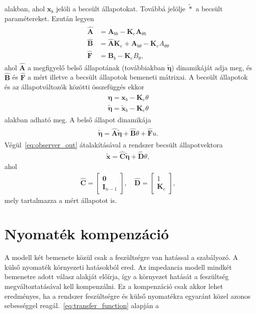 alakban, ahol $\bm{x}_b$ jelöli a becsült állapotokat. Továbbá jelölje $\tilde{*}$ 
a becsült paramétereket. Ezután legyen
\begin{align}
    \begin{split}
    \hat{\bm A} &= \bm A_{bb} - \bm K_e \bm A_{\theta b} \\
    \hat{\bm B} &= \hat{\bm A} \bm K_e + \bm A_{b \theta} - \bm K_e A_{\theta \theta} \\
    \hat{\bm F} &= \bm B_b - \bm K_e B_\theta,
    \end{split}
\end{align}
ahol $\hat{\bm A}$ a megfigyelő belső állapotának (továbbiakban $\tilde{\bm \eta}$) 
dinamikáját adja meg, és $\hat{\bm B}$ és $\hat{\bm F}$ a mért illetve a becsült állapotok 
bemeneti mátrixai. A becsült állapotok és az állapotváltozók közötti összefüggés ekkor
\begin{align}
    \begin{split}
    \bm \eta = \bm x_b - \bm K_e \theta \\
    \tilde{\bm \eta} = \tilde{\bm x}_b - \bm K_e \theta
    \end{split}
\end{align}
alakban adható meg. A belső állapot dinamikája
\begin{align}
    \begin{split}
    \dot{\tilde{\bm \eta}} = \hat{\bm A} \tilde{\bm \eta} + \hat{\bm B} \theta + \hat{\bm F} u.
    \end{split}
\end{align}
Végül~\eqref{eq:observer_out} átalakításával a rendszer becsült állapotvektora
\begin{align}
    \tilde{\bm x} = \hat{\bm C} \tilde{\bm \eta} + \hat{\bm D} \theta,
\end{align}
ahol
\begin{align}
    \hat{\bm C} = 
    \begin{bmatrix}
        \bm 0 \\
        \bm I_{n-1}
    \end{bmatrix},
    \quad
    \hat{\bm D} = 
    \begin{bmatrix}
        1 \\
        \bm K_e
    \end{bmatrix},
\end{align}
mely tartalmazza a mért állapotot is.

\section{Nyomaték kompenzáció}
A modell két bemenete közül csak a feszültségre van hatással a 
szabályozó. A külső nyomaték környezeti hatásokból ered. Az impedancia 
modell mindkét bemenetre adott válasz alakját előírja, így a környezet 
hatását a feszültség megváltoztatásával kell kompenzálni. Ez a kompenzáció
csak akkor lehet eredményes, ha a rendszer feszültségre és külső nyomatékra 
egyaránt közel azonos sebességgel reagál.~\eqref{eq:transfer_function} alapján
a 

